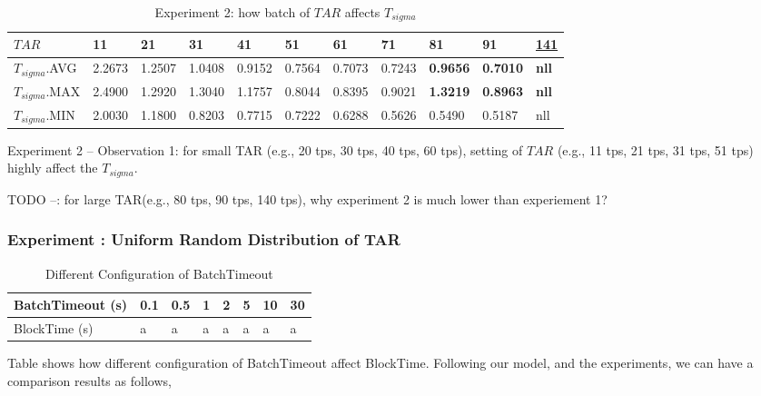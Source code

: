 \documentclass[10pt,journal,compsoc, twoside]{IEEEtran}
\begin{document}
\begin{table*}[htbp]
	\caption{Experiment 2: how batch of $TAR$ affects $T_{sigma}$}
	\begin{tabular}{|l|l|l|l|l|l|l|l|l|l|l|}
		\hline
		$TAR$           & 11     & 21     & 31     & 41     & 51     & 61     & 71     & 81              & 91              & {\underline{141}}    \\ \hline
		$T_{sigma}$.AVG & 2.2673 & 1.2507 & 1.0408 & 0.9152 & 0.7564 & 0.7073 & 0.7243 & \textbf{0.9656} & \textbf{0.7010} & \textbf{nll} \\ \hline
		$T_{sigma}$.MAX & 2.4900 & 1.2920 & 1.3040 & 1.1757 & 0.8044 & 0.8395 & 0.9021 & \textbf{1.3219} & \textbf{0.8963} & \textbf{nll} \\ \hline
		$T_{sigma}$.MIN & 2.0030 & 1.1800 & 0.8203 & 0.7715 & 0.7222 & 0.6288 & 0.5626 & 0.5490          & 0.5187          & nll          \\ \hline
	\end{tabular}
\end{table*}


Experiment 2 -- Observation 1: for small TAR (e.g., 20 tps, 30 tps, 40 tps, 60 tps), setting of $TAR$ (e.g., 11 tps, 21 tps, 31 tps, 51 tps) highly affect the $T_{sigma}$.

TODO --: for large TAR(e.g., 80 tps, 90 tps, 140 tps), why experiment 2 is much lower than experiement 1?








\subsubsection{Experiment : Uniform Random Distribution of TAR}

\begin{table}[htbp]
	\caption{Different Configuration of BatchTimeout}
	\begin{tabular}{|l|l|l|l|l|l|l|l|}
		\hline
		BatchTimeout (s) & 0.1 & 0.5 & 1 & 2 & 5 & 10 & 30 \\ \hline
		BlockTime (s)    & a   & a   & a & a & a & a  & a  \\ \hline
	\end{tabular}
\end{table}

Table shows how different configuration of BatchTimeout affect BlockTime. Following our model, and the experiments, we can have a comparison results as follows,
\end{document}
